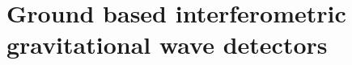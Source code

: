 \section{Ground based interferometric gravitational wave detectors}\label{sec:groundbased}









